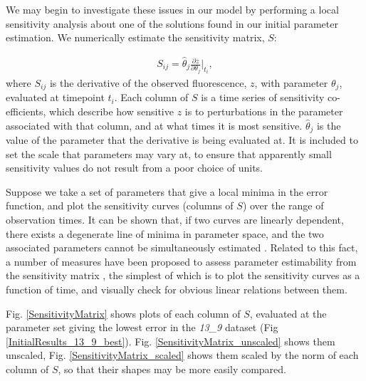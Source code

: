 \documentclass[10pt,journal]{./IEEE_latex_class/IEEEtran}
\begin{document}
 We may begin to investigate these issues in our model by performing a local sensitivity analysis about one of the solutions found in our initial parameter estimation. We numerically estimate the sensitivity matrix, $S$:
 
 \begin{align}
S_{ij} = \hat{\theta}_{j} \frac{\partial z}{ \partial \theta_{j}}\Bigr|_{t_{i}},
\label{eq:Sensitivity}
\end{align}
where $S_{ij}$ is the derivative of the observed fluorescence, $z$, with parameter $\theta_{j}$, evaluated at timepoint $t_{i}$. Each column of $S$ is a time series of sensitivity co-efficients, which describe how sensitive $z$ is to perturbations in the parameter associated with that column, and at what times it is most sensitive. $\hat{\theta}_{j}$ is the value of the parameter that the derivative is being evaluated at. It is included to set the scale that parameters may vary at, to ensure that apparently small sensitivity values do not result from a poor choice of units.

Suppose we take a set of parameters that give a local minima in the error function, and plot the sensitivity curves (columns of $S$)  over the range of observation times. It can be shown that, if two curves are linearly dependent, there exists a degenerate line of minima in parameter space, and the two associated parameters cannot be simultaneously estimated \cite{Beck}. Related to this fact, a number of measures have been proposed to assess parameter estimability from the sensitivity matrix \cite{Mclean2012}, the simplest of which is to plot the sensitivity curves as a function of time, and visually check for obvious linear relations between them.

Fig. \ref{SensitivityMatrix} shows plots of each column of $S$, evaluated at the parameter set giving the lowest error in the \textit{13\_9} dataset (Fig \ref{InitialResults_13_9_best}). Fig. \ref{SensitivityMatrix_unscaled} shows them unscaled, Fig. \ref{SensitivityMatrix_scaled} shows them scaled by the norm of each column of $S$, so that their shapes may be more easily compared.
\end{document}
